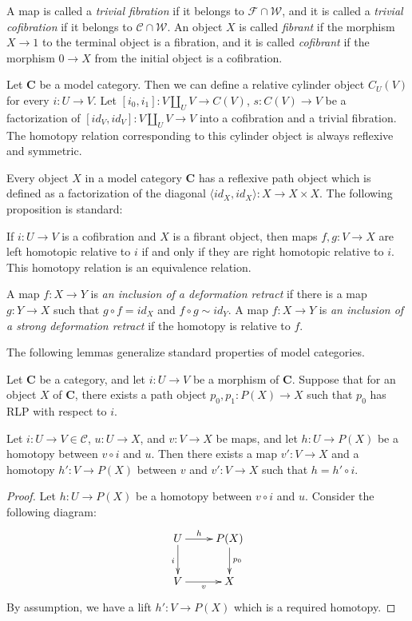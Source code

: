 \documentclass{amsart}
\theoremstyle{definition}
\newcommand{\we}{\mathcal{W}}
\newcommand{\fib}{\mathcal{F}}
\newcommand{\cof}{\mathcal{C}}
\newcommand{\cat}[1]{\mathbf{#1}}
\newcommand{\C}{\cat{C}}
\newcommand{\cyli}{i}
\begin{document}
A map is called a \emph{trivial fibration} if it belongs to $\fib \cap \we$,
and it is called a \emph{trivial cofibration} if it belongs to $\cof \cap \we$.
An object $X$ is called \emph{fibrant} if the morphism $X \to 1$ to the terminal object is a fibration,
and it is called \emph{cofibrant} if the morphism $0 \to X$ from the initial object is a cofibration.

Let $\C$ be a model category.
Then we can define a relative cylinder object $C_U(V)$ for every $i : U \to V$.
Let $[\cyli_0,\cyli_1] : V \amalg_U V \to C(V)$, $s : C(V) \to V$ be a factorization of $[id_V,id_V] : V \amalg_U V \to V$ into a cofibration and a trivial fibration.
The homotopy relation corresponding to this cylinder object is always reflexive and symmetric.

Every object $X$ in a model category $\C$ has a reflexive path object which is defined as a factorization of the diagonal $\langle id_X, id_X \rangle : X \to X \times X$.
The following proposition is standard:
\begin{prop}
If $i : U \to V$ is a cofibration and $X$ is a fibrant object, then maps $f,g : V \to X$ are left homotopic relative to $i$ if and only if they are right homotopic relative to $i$.
This homotopy relation is an equivalence relation.
\end{prop}

A map $f : X \to Y$ is \emph{an inclusion of a deformation retract} if there is
a map $g : Y \to X$ such that $g \circ f = id_X$ and $f \circ g \sim id_Y$.
A map $f : X \to Y$ is \emph{an inclusion of a strong deformation retract} if the homotopy is relative to $f$.

The following lemmas generalize standard properties of model categories.

\begin{lem}
Let $\C$ be a category, and let $i : U \to V$ be a morphism of $\C$.
Suppose that for an object $X$ of $\C$, there exists a path object $p_0,p_1 : P(X) \to X$ such that $p_0$ has RLP with respect to $i$.

Let $i : U \to V \in \cof$, $u : U \to X$, and $v : V \to X$ be maps, and let $h : U \to P(X)$ be a homotopy between $v \circ i$ and $u$.
Then there exists a map $v' : V \to X$ and a homotopy $h' : V \to P(X)$ between $v$ and $v' : V \to X$ such that $h = h' \circ i$.
\end{lem}
\begin{proof}
Let $h : U \to P(X)$ be a homotopy between $v \circ i$ and $u$.
Consider the following diagram:
\[ \xymatrix{ U \ar[r]^-h \ar[d]_i & P(X) \ar[d]^{p_0} \\
              V \ar[r]_v & X
            } \]
By assumption, we have a lift $h' : V \to P(X)$ which is a required homotopy.
\end{proof}
\end{document}
